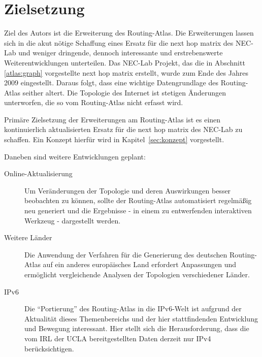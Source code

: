 \section{Zielsetzung}\label{sec:zielsetzung}

Ziel des Autors ist die Erweiterung des Routing-Atlas.
Die Erweiterungen lassen sich in die akut nötige Schaffung eines Ersatz für die next hop matrix des NEC-Lab und weniger dringende, dennoch interessante und erstrebenswerte Weiterentwicklungen unterteilen.
Das NEC-Lab Projekt, das die in Abschnitt \ref{atlas:graph} vorgestellte next hop matrix erstellt, wurde zum Ende des Jahres 2009 eingestellt.
Daraus folgt, dass eine wichtige Datengrundlage des Routing-Atlas seither altert.
Die Topologie des Internet ist stetigen Änderungen unterworfen, die so vom Routing-Atlas nicht erfasst wird.

Primäre Zielsetzung der Erweiterungen am Routing-Atlas ist es einen kontinuierlich aktualisierten Ersatz für die next hop matrix des NEC-Lab zu schaffen. Ein Konzept hierfür wird in Kapitel~\ref{sec:konzept} vorgestellt.

Daneben sind weitere Entwicklungen geplant:
\begin{description}
 \item[Online-Aktualisierung] Um Veränderungen der Topologie und deren Auswirkungen besser beobachten zu können, sollte der Routing-Atlas automatisiert regelmäßig neu generiert und die Ergebnisse - in einem zu entwerfenden interaktiven Werkzeug - dargestellt werden.
 \item[Weitere Länder] Die Anwendung der Verfahren für die Generierung des deutschen Routing-Atlas auf ein anderes europäisches Land erfordert Anpassungen und ermöglicht vergleichende Analysen der Topologien verschiedener Länder.
 \item[IPv6] Die "`Portierung"' des Routing-Atlas in die IPv6-Welt ist aufgrund der Aktualität dieses Themenbereichs und der hier stattfindenden Entwicklung und Bewegung interessant. Hier stellt sich die Herausforderung, dass die vom IRL der UCLA bereitgestellten Daten derzeit nur IPv4 berücksichtigen.
\end{description}

